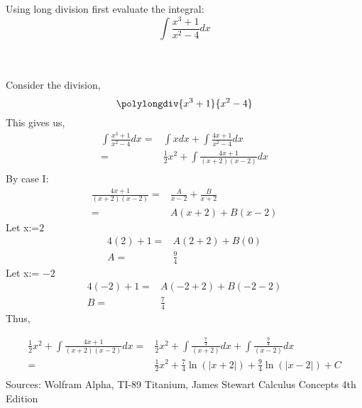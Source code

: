 \documentclass[10pt,letterpaper,cm]{hmcpset}
\begin{document}
\newpage
\begin{problem}[4]
  Using long division first evaluate the integral:
  \begin{equation*}
    \int\frac{x^3 + 1}{x^2-4}dx 
  \end{equation*}
\end{problem}\\
\\
Consider the division,
\begin{equation*}
  \polylongdiv{x^3+1}{x^2-4}
\end{equation*}
This gives us,
\begin{align*}
  \int\frac{x^3 + 1}{x^2-4}dx
  =& \int xdx + \int\frac{4x+1}{x^2-4}dx  \\
  =& \frac{1}{2}x^2 + \int\frac{4x+1}{(x+2)(x-2)}dx  \\
\end{align*}
By case I:
\begin{align*}
  \frac{4x+1}{(x+2)(x-2)}
  =&\frac{A}{x-2}+\frac{B}{x+2}\\ 
  =&A(x+2)+B(x-2)
\end{align*}
Let x:=$2$
\begin{align*}
  4(2)+1=&A(2+2)+B(0) \\
  A     =&\frac{9}{4}
\end{align*}
Let x:= $-2$
\begin{align*}
  4(-2)+1=&A(-2+2)+B(-2-2) \\
  B     =&\frac{7}{4}
\end{align*}
Thus,

\begin{align*}
  \frac{1}{2}x^2 + \int\frac{4x+1}{(x+2)(x-2)}dx
  =& \frac{1}{2}x^2 + \int\frac{\frac{7}{4}}{(x+2)}dx + \int\frac{\frac{9}{4}}{(x-2)}dx \\
  =& \frac{1}{2}x^2 + \frac{7}{4}\ln(|x+2|) + \frac{9}{4}\ln(|x-2|) + C \\
\end{align*}
Sources: Wolfram Alpha, TI-89 Titanium, James Stewart Calculus Concepts 4th Edition
\end{document}
